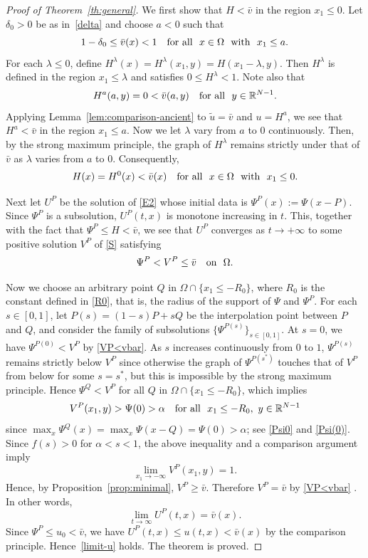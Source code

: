 \documentclass[a4paper,12pt,fullpage]{article}
\numberwithin{equation}{section}
\def\R{{\mathbb R}}
\begin{document}
\begin{proof}[Proof of Theorem~\ref{th:general}]
We first show that $H<\bar{v}$ in the region $x_1\leq 0$. Let $\delta_0>0$ be as in~\eqref{delta} and choose $a<0$ such that
\[
1-\delta_0 \leq \bar{v}(x)<1 \quad\hbox{for all}\ \ x\in\Omega\ \ \hbox{with}\ \ x_1\leq a.
\]
For each $\lambda\leq 0$, define $H^\lambda(x)=H^\lambda(x_1,y)=H(x_1-\lambda,y)$. Then $H^\lambda$ is defined in the region $x_1 \leq \lambda$ and satisfies $0\leq H^\lambda<1$. Note also that
\[
H^a(a,y)=0<\bar{v}(a,y) \quad\hbox{for all}\ \ y\in\R^{N-1}.
\]
Applying Lemma~\ref{lem:comparison-ancient} to $\tilde{u}=\bar{v}$ and $u=H^a$, we see that $H^a<\bar{v}$ in the region $x_1\leq a$. Now we let $\lambda$ vary from $a$ to $0$ continuously. Then, by the strong maximum principle, the graph of $H^\lambda$ remains strictly under that of $\bar{v}$ as $\lambda$ varies from $a$ to $0$. Consequently, 
\[
H(x)=H^0(x)<\bar{v}(x) \quad\hbox{for all}\ \ x\in\Omega\ \ \hbox{with}\ \ x_1\leq 0.
\]

Next let $U^P$ be the solution of \eqref{E2} whose initial data is $\Psi^P(x):=\Psi(x-P)$. Since $\Psi^P$ is a subsolution, $U^P(t,x)$ is monotone increasing in $t$. This, together with the fact that $\Psi^P\leq H<\bar{v}$, we see that $U^P$ converges as $t\to+\infty$ to some positive solution $V^P$ of \eqref{S} satisfying
\begin{equation}\label{VP<vbar}
\Psi^P<V^P \leq \bar{v} \quad \hbox{on} \ \ \Omega.
\end{equation}

Now we choose an arbitrary point $Q$ in $\Omega\cap\{x_1\leq -R_0\}$, where $R_0$ is the constant defined in \eqref{R0}, that is, the radius of the support of $\Psi$ and $\Psi^P$. For each $s\in[0,1]$, let $P(s)=(1-s)P+sQ$ be the interpolation point between $P$ and $Q$, and consider the family of subsolutions $\{\Psi^{P(s)}\}_{s\in[0,1]}$. At $s=0$, we have $\Psi^{P(0)}<V^P$ by \eqref{VP<vbar}. As $s$ increases continuously from $0$ to $1$, $\Psi^{P(s)}$ remains strictly below $V^P$ since otherwise the graph of $\Psi^{P(s^*)}$ touches that of $V^P$ from below for some $s=s^*$, but this is impossible by the strong maximum principle. Hence $\Psi^Q<V^P$ for all $Q$ in $\Omega\cap\{x_1\leq -R_0\}$, which implies
\[
V^P(x_1,y)>\Psi(0)>\alpha \quad \hbox{for all}\ \ x_1\leq -R_0,\ y\in\R^{N-1}
\]
since $\max_x \Psi^Q(x)=\max_x\Psi(x-Q)=\Psi(0)>\alpha$; see \eqref{Psi0} and \eqref{Psi(0)}. Since $f(s)>0$ for $\alpha<s<1$, the above inequality and a comparison argument imply
\[
\lim_{x_1\to-\infty}V^P(x_1,y)=1.
\]
Hence, by Proposition~\ref{prop:minimal}, $V^P\geq \bar{v}$. Therefore $V^P=\bar{v}$ by \eqref{VP<vbar} . In other words,
\[
\lim_{t\to\infty}U^P(t,x)=\bar{v}(x).
\]
Since $\Psi^P\leq u_0< \bar{v}$, we have $U^P(t,x)\leq u(t,x)<\bar{v}(x)$ by the comparison principle. Hence~\eqref{limit-u} holds. The theorem is proved.
\end{proof}
\end{document}
